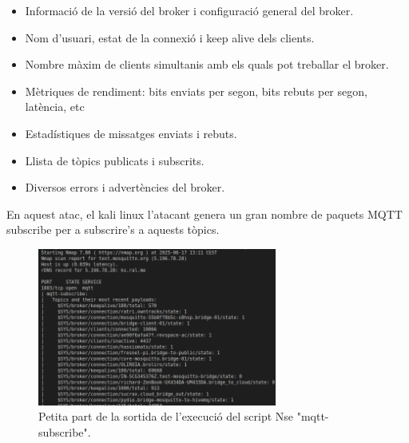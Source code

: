 \begin{itemize}
    \item Informació de la versió del broker i configuració general del broker.
    \item Nom d'usuari, estat de la connexió i keep alive dels clients.
    \item Nombre màxim de clients simultanis amb els quals pot treballar el broker.
    \item Mètriques de rendiment: bits enviats per segon, bits rebuts per segon, latència, etc
    \item Estadístiques de missatges enviats i rebuts.
    \item Llista de tòpics publicats i subscrits.
    \item Diversos errors i advertències del broker.
\end{itemize}

En aquest atac, el kali linux l'atacant genera un gran nombre de paquets MQTT subscribe per a subscrire's a aquests tòpics. 

\begin{figure}[H]
    \centering
    \includegraphics[width=0.7\textwidth]{img/nmapNSE.png}
    \caption{Petita part de la sortida de l'execució del script Nse "mqtt-subscribe".}
    \label{fig:NmapNSE}
\end{figure}

